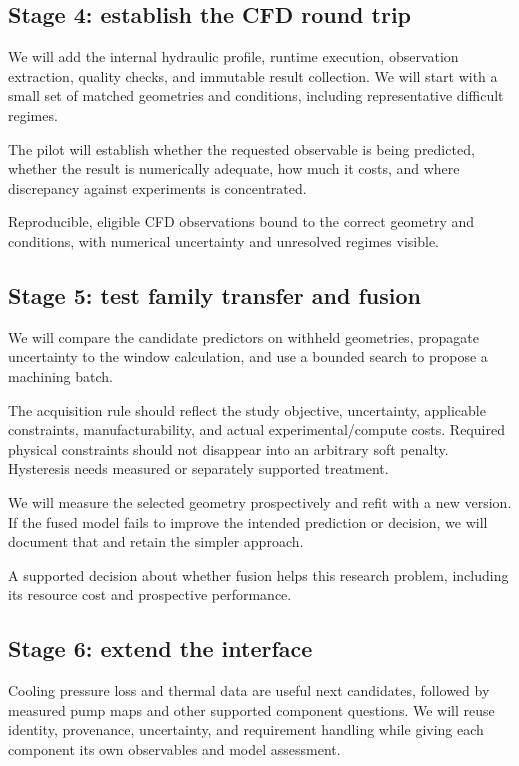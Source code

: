 \subsection{Stage 4: establish the CFD round trip}

We will add the internal hydraulic profile, runtime execution, observation extraction, quality checks, and immutable result collection. We will start with a small set of matched geometries and conditions, including representative difficult regimes.

The pilot will establish whether the requested observable is being predicted, whether the result is numerically adequate, how much it costs, and where discrepancy against experiments is concentrated.

Reproducible, eligible CFD observations bound to the correct geometry and conditions, with numerical uncertainty and unresolved regimes visible.

\subsection{Stage 5: test family transfer and fusion}

We will compare the candidate predictors on withheld geometries, propagate uncertainty to the window calculation, and use a bounded search to propose a machining batch.

The acquisition rule should reflect the study objective, uncertainty, applicable constraints, manufacturability, and actual experimental/compute costs. Required physical constraints should not disappear into an arbitrary soft penalty. Hysteresis needs measured or separately supported treatment.

We will measure the selected geometry prospectively and refit with a new version. If the fused model fails to improve the intended prediction or decision, we will document that and retain the simpler approach.

A supported decision about whether fusion helps this research problem, including its resource cost and prospective performance.

\subsection{Stage 6: extend the interface}

Cooling pressure loss and thermal data are useful next candidates, followed by measured pump maps and other supported component questions. We will reuse identity, provenance, uncertainty, and requirement handling while giving each component its own observables and model assessment.

